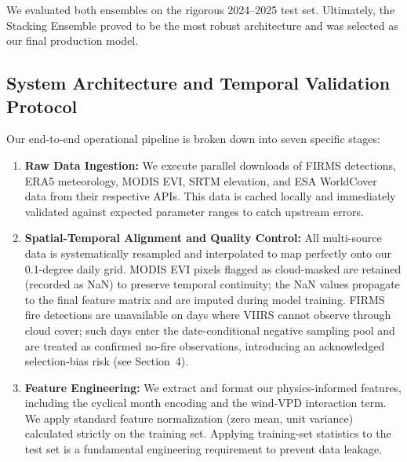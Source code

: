 \documentclass[11pt]{article}
\begin{document}
We evaluated both ensembles on the rigorous 2024--2025 test set. Ultimately, the Stacking Ensemble proved to be the most robust architecture and was selected as our final production model.

\subsection{System Architecture and Temporal Validation Protocol}

Our end-to-end operational pipeline is broken down into seven specific stages:

\begin{enumerate}
    \item \textbf{Raw Data Ingestion:} We execute parallel downloads of FIRMS detections, ERA5 meteorology, MODIS EVI, SRTM elevation, and ESA WorldCover data from their respective APIs. This data is cached locally and immediately validated against expected parameter ranges to catch upstream errors.
    
    \item \textbf{Spatial-Temporal Alignment and Quality Control:} All multi-source data is systematically resampled and interpolated to map perfectly onto our 0.1-degree daily grid. MODIS EVI pixels flagged as cloud-masked are retained (recorded as NaN) to preserve temporal continuity; the NaN values propagate to the final feature matrix and are imputed during model training. FIRMS fire detections are unavailable on days where VIIRS cannot observe through cloud cover; such days enter the date-conditional negative sampling pool and are treated as confirmed no-fire observations, introducing an acknowledged selection-bias risk (see Section~4).
    
    \item \textbf{Feature Engineering:} We extract and format our physics-informed features, including the cyclical month encoding and the wind-VPD interaction term. We apply standard feature normalization (zero mean, unit variance) calculated strictly on the training set. Applying training-set statistics to the test set is a fundamental engineering requirement to prevent data leakage.
    

\end{enumerate}
\end{document}
